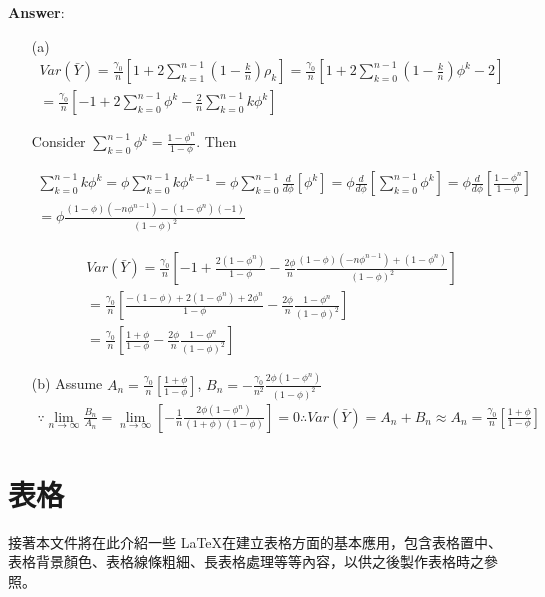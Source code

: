   {\bf Answer}:
  \begin{itemize}
  \item[(a)] 
  \begin{eqnarray*}
Var(\bar{Y})=\frac{\gamma_0}{n}[1+2\sum_{k=1}^{n-1}(1-\frac{k}{n})\rho_k]=\frac{\gamma_0}{n}[1+2\sum_{k=0}^{n-1}(1-\frac{k}{n})\phi^k-2]\\
  =\frac{\gamma_0}{n}[-1+2\sum_{k=0}^{n-1}\phi^k-\frac{2}{n}\sum_{k=0}^{n-1}k\phi^k]
  \end{eqnarray*}

Consider $\sum_{k=0}^{n-1}\phi^k=\frac{1-\phi^n}{1-\phi}$. Then
  
  \begin{eqnarray*}
\sum_{k=0}^{n-1}k\phi^k=\phi \sum_{k=0}^{n-1}k\phi^{k-1}=\phi \sum_{k=0}^{n-1}\frac{d}{d\phi}[\phi^k]=\phi \frac{d}{d\phi}[\sum_{k=0}^{n-1}\phi^k]=\phi \frac{d}{d\phi}[\frac{1-\phi^n}{1-\phi}]\\
  =\phi \frac{(1-\phi)(-n\phi^{n-1})-(1-\phi^n)(-1)}{(1-\phi)^2}
  \end{eqnarray*}
  
  \begin{eqnarray*}
Var(\bar{Y})=\frac{\gamma_0}{n}[-1+ \frac{2(1-\phi^n)}{1-\phi}-\frac{2\phi}{n}\frac{(1-\phi)(-n\phi^{n-1})+(1-\phi^n)}{(1-\phi)^2}]\\
  =\frac{\gamma_0}{n}[\frac{-(1-\phi)+2(1-\phi^n)+2\phi^n}{1-\phi}-\frac{2\phi}{n}\frac{1-\phi^n}{(1-\phi)^2}]\\=\frac{\gamma_0}{n}[\frac{1+\phi}{1-\phi}-\frac{2\phi}{n}\frac{1-\phi^n}{(1-\phi)^2}]
  \end{eqnarray*}
  
  \item[(b)] Assume $A_n=\frac{\gamma_0}{n}[\frac{1+\phi}{1-\phi}]$, $B_n=-\frac{\gamma_0}{n^2}\frac{2\phi(1-\phi^n)}{(1-\phi)^2}$
  \begin{eqnarray*}
  \because \lim_{n \to \infty} \frac{B_n}{A_n}=\lim_{n \to \infty}[-\frac{1}{n}\frac{2\phi(1-\phi^n)}{(1+\phi)(1-\phi)}]=0
  \therefore Var(\bar{Y})=A_n+B_n \approx A_n=\frac{\gamma_0}{n}[\frac{1+\phi}{1-\phi}]
  \end{eqnarray*}

  \end{itemize}
 
\section{表格}
接著本文件將在此介紹一些 \LaTeX 在建立表格方面的基本應用，包含表格置中、表格背景顏色、表格線條粗細、長表格處理等等內容，以供之後製作表格時之參照。
